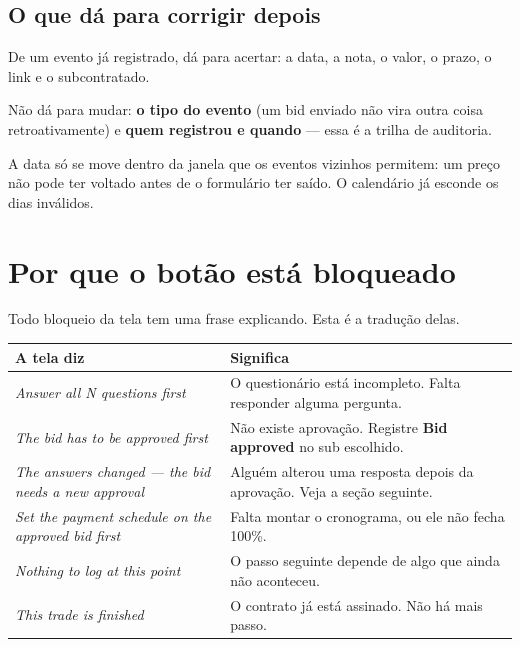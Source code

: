 \documentclass[11pt,a4paper]{article}
\newcommand{\ui}[1]{\textbf{\textsf{#1}}}
\begin{document}
\subsection{O que dá para corrigir depois}

De um evento já registrado, dá para acertar: a data, a nota, o valor, o prazo, o
link e o subcontratado.

Não dá para mudar: \textbf{o tipo do evento} (um bid enviado não vira outra coisa
retroativamente) e \textbf{quem registrou e quando} — essa é a trilha de
auditoria.

A data só se move dentro da janela que os eventos vizinhos permitem: um preço não
pode ter voltado antes de o formulário ter saído. O calendário já esconde os dias
inválidos.

\section{Por que o botão está bloqueado}

Todo bloqueio da tela tem uma frase explicando. Esta é a tradução delas.

\begin{longtable}{@{}p{7.2cm}p{7.4cm}@{}}
\toprule
\textbf{A tela diz} & \textbf{Significa} \\
\midrule
\endhead
\emph{Answer all N questions first} & O questionário está incompleto. Falta
responder alguma pergunta. \\[4pt]

\emph{The bid has to be approved first} & Não existe aprovação. Registre
\ui{Bid approved} no sub escolhido. \\[4pt]

\emph{The answers changed — the bid needs a new approval} & Alguém alterou uma
resposta depois da aprovação. Veja a seção seguinte. \\[4pt]

\emph{Set the payment schedule on the approved bid first} & Falta montar o
cronograma, ou ele não fecha 100\%. \\[4pt]

\emph{Nothing to log at this point} & O passo seguinte depende de algo que ainda
não aconteceu. \\[4pt]

\emph{This trade is finished} & O contrato já está assinado. Não há mais passo. \\
\bottomrule
\end{longtable}
\end{document}
